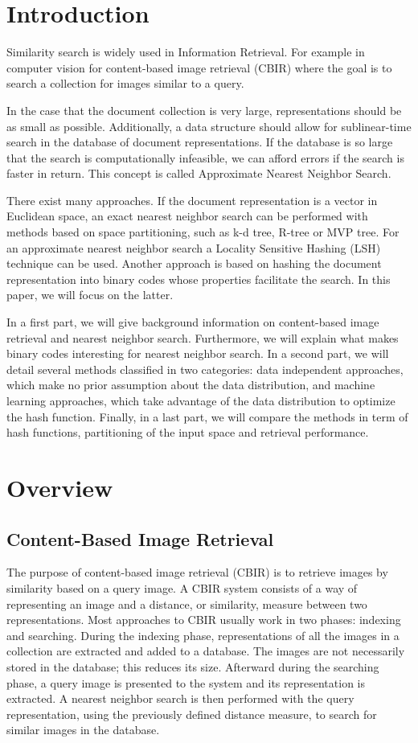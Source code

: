 \section{Introduction}
Similarity search is widely used in Information Retrieval. For example in computer vision for content-based image retrieval (CBIR) where the goal is to search a collection for images similar to a query.

In the case that the document collection is very large, representations should be as small as possible. Additionally, a data structure should allow for sublinear-time search in the database of document representations. If the database is so large that the search is computationally infeasible, we can afford errors if the search is faster in return. This concept is called Approximate Nearest Neighbor Search.

There exist many approaches. If the document representation is a vector in Euclidean space, an exact nearest neighbor search can be performed with methods based on space partitioning, such as k-d tree, R-tree or MVP tree. For an approximate nearest neighbor search a Locality Sensitive Hashing (LSH) technique can be used. Another approach is based on hashing the document representation into binary codes whose properties facilitate the search. In this paper, we will focus on the latter.

In a first part, we will give background information on content-based image retrieval and nearest neighbor search. Furthermore, we will explain what makes binary codes interesting for nearest neighbor search. In a second part, we will detail several methods classified in two categories: data independent approaches, which make no prior assumption about the data distribution, and machine learning approaches, which take advantage of the data distribution to optimize the hash function. Finally, in a last part, we will compare the methods in term of hash functions, partitioning of the input space and retrieval performance.

\section{Overview}

\subsection{Content-Based Image Retrieval}
The purpose of content-based image retrieval (CBIR) is to retrieve images by similarity based on a query image. A CBIR system consists of a way of representing an image and a distance, or similarity, measure between two representations. Most approaches to CBIR usually work in two phases: indexing and searching. During the indexing phase, representations of all the images in a collection are extracted and added to a database. The images are not necessarily stored in the database; this reduces its size. Afterward during the searching phase, a query image is presented to the system and its representation is extracted. A nearest neighbor search is then performed with the query representation, using the previously defined distance measure, to search for similar images in the database.

